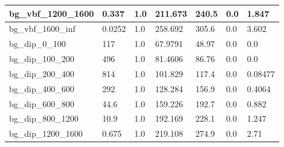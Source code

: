 \documentclass[a4paper, 10pt]{article}
\begin{document}
\begin{table}[H]
\begin{center}
\begin{tabular}{|m{23.0mm}|m{23.0mm}|m{18.0mm}|m{19.0mm}|m{19.0mm}|m{19.0mm}|m{19.0mm}|}
      \hline
      {\cellcolor{white}         bg\_vbf\_1200\_1600}& {\cellcolor{white}         0.337}& {\cellcolor{white}         1.0}& {\cellcolor{white}         211.673}& {\cellcolor{white}         240.5}& {\cellcolor{green}         0.0}& {\cellcolor{green}         1.847}\\
      \hline
      {\cellcolor{white}         bg\_vbf\_1600\_inf}& {\cellcolor{white}         0.0252}& {\cellcolor{white}         1.0}& {\cellcolor{white}         258.692}& {\cellcolor{white}         305.6}& {\cellcolor{green}         0.0}& {\cellcolor{green}         3.602}\\
      \hline
      {\cellcolor{white}         bg\_dip\_0\_100}& {\cellcolor{white}         117}& {\cellcolor{white}         1.0}& {\cellcolor{white}         67.9791}& {\cellcolor{white}         48.97}& {\cellcolor{green}         0.0}& {\cellcolor{green}         0.0}\\
      \hline
      {\cellcolor{white}         bg\_dip\_100\_200}& {\cellcolor{white}         496}& {\cellcolor{white}         1.0}& {\cellcolor{white}         81.4606}& {\cellcolor{white}         86.76}& {\cellcolor{green}         0.0}& {\cellcolor{green}         0.0}\\
      \hline
      {\cellcolor{white}         bg\_dip\_200\_400}& {\cellcolor{white}         814}& {\cellcolor{white}         1.0}& {\cellcolor{white}         101.829}& {\cellcolor{white}         117.4}& {\cellcolor{green}         0.0}& {\cellcolor{green}         0.08477}\\
      \hline
      {\cellcolor{white}         bg\_dip\_400\_600}& {\cellcolor{white}         292}& {\cellcolor{white}         1.0}& {\cellcolor{white}         128.284}& {\cellcolor{white}         156.9}& {\cellcolor{green}         0.0}& {\cellcolor{green}         0.4064}\\
      \hline
      {\cellcolor{white}         bg\_dip\_600\_800}& {\cellcolor{white}         44.6}& {\cellcolor{white}         1.0}& {\cellcolor{white}         159.226}& {\cellcolor{white}         192.7}& {\cellcolor{green}         0.0}& {\cellcolor{green}         0.882}\\
      \hline
      {\cellcolor{white}         bg\_dip\_800\_1200}& {\cellcolor{white}         10.9}& {\cellcolor{white}         1.0}& {\cellcolor{white}         192.169}& {\cellcolor{white}         228.1}& {\cellcolor{green}         0.0}& {\cellcolor{green}         1.247}\\
      \hline
      {\cellcolor{white}         bg\_dip\_1200\_1600}& {\cellcolor{white}         0.675}& {\cellcolor{white}         1.0}& {\cellcolor{white}         219.108}& {\cellcolor{white}         274.9}& {\cellcolor{green}         0.0}& {\cellcolor{green}         2.71}\\

\end{tabular}
\end{center}
\end{table}
\end{document}
